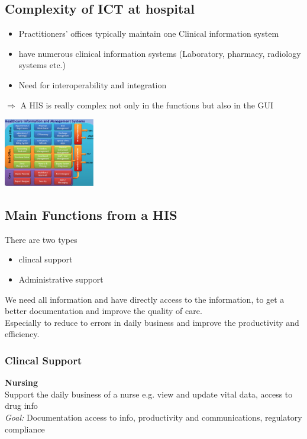\documentclass{report}
\newenvironment{Figure}
	{\par\medskip\noindent\minipage{\linewidth}}
	{\endminipage\par\medskip}
\theoremstyle{definition}
\theoremstyle{example}
\begin{document}
\subsection{Complexity of ICT at hospital}
\begin{itemize}
   \item Practitioners' offices typically maintain one Clinical information system
   \item have numerous clinical information systems (Laboratory, pharmacy, radiology systems etc.)
   \item Need for interoperability and integration
\end{itemize}
$\Rightarrow$ A HIS is really complex not only in the functions but also in the GUI
\begin{Figure}
   \centering
    \includegraphics[width=150px]{img/HIS.png}
        \label{fig:HIS}
\end{Figure}

\subsection{Main Functions from a HIS}
There are two types
\begin{itemize}
   \item clincal support
   \item Administrative support
\end{itemize}

We need all information and have directly access to the information, to get a better documentation and improve the quality of care.\\ 
Especially to reduce to errors in daily business and improve the productivity and efficiency.


\subsubsection{Clincal Support}
\textbf{Nursing}\\
Support the daily business of a nurse e.g. view and update vital data, access to drug info\\
\textit{Goal:} Documentation access to info, productivity and communications, regulatory compliance\\
\end{document}

